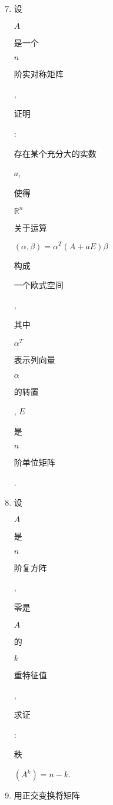 \documentclass[10pt]{article}
\begin{document}
\begin{enumerate}
  \setcounter{enumi}{6}
  \item \begin{CJK}{UTF8}{mj}设\end{CJK} $A$ \begin{CJK}{UTF8}{mj}是一个\end{CJK} $n$ \begin{CJK}{UTF8}{mj}阶实对称矩阵\end{CJK}, \begin{CJK}{UTF8}{mj}证明\end{CJK}: \begin{CJK}{UTF8}{mj}存在某个充分大的实数\end{CJK} $a$, \begin{CJK}{UTF8}{mj}使得\end{CJK} $\mathbb{R}^{n}$ \begin{CJK}{UTF8}{mj}关于运算\end{CJK} $(\alpha, \beta)=\alpha^{T}(A+a E) \beta$ \begin{CJK}{UTF8}{mj}构成\end{CJK} \begin{CJK}{UTF8}{mj}一个欧式空间\end{CJK}, \begin{CJK}{UTF8}{mj}其中\end{CJK} $\alpha^{T}$ \begin{CJK}{UTF8}{mj}表示列向量\end{CJK} $\alpha$ \begin{CJK}{UTF8}{mj}的转置\end{CJK}, $E$ \begin{CJK}{UTF8}{mj}是\end{CJK} $n$ \begin{CJK}{UTF8}{mj}阶单位矩阵\end{CJK}.

  \item \begin{CJK}{UTF8}{mj}设\end{CJK} $A$ \begin{CJK}{UTF8}{mj}是\end{CJK} $n$ \begin{CJK}{UTF8}{mj}阶复方阵\end{CJK}, \begin{CJK}{UTF8}{mj}零是\end{CJK} $A$ \begin{CJK}{UTF8}{mj}的\end{CJK} $k$ \begin{CJK}{UTF8}{mj}重特征值\end{CJK}, \begin{CJK}{UTF8}{mj}求证\end{CJK}: \begin{CJK}{UTF8}{mj}秩\end{CJK} $\left(A^{k}\right)=n-k$.

  \item \begin{CJK}{UTF8}{mj}用正交变换将矩阵\end{CJK}

\end{enumerate}
\end{document}
